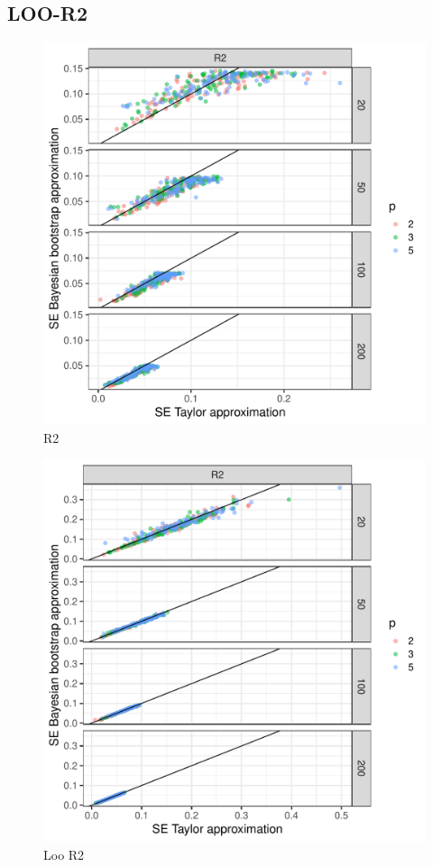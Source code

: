 \documentclass{article}
\begin{document}
\subsection{LOO-R2}

\begin{figure}[!htb]
    \centering
    \includegraphics[width=\textwidth]{r2.pdf}
    \caption{R2}
    \label{fig:r2-plot}
\end{figure}

\begin{figure}[!htb]
    \centering
    \includegraphics[width=\textwidth]{loo_r2.pdf}
    \caption{Loo R2}
    \label{fig:loo-r2-plot}
\end{figure}

\newpage


\end{document}
